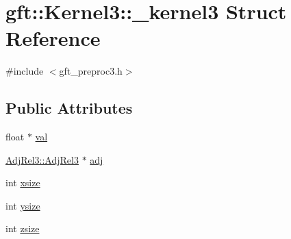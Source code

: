 \hypertarget{structgft_1_1Kernel3_1_1__kernel3}{\section{gft\-:\-:Kernel3\-:\-:\-\_\-kernel3 Struct Reference}
\label{structgft_1_1Kernel3_1_1__kernel3}
}


{\ttfamily \#include $<$gft\-\_\-preproc3.\-h$>$}

\subsection*{Public Attributes}
\begin{DoxyCompactItemize}
\item 
float $\ast$ \hyperlink{structgft_1_1Kernel3_1_1__kernel3_a2cf5ef95427f4d81f2634a065f69c0af}{val}
\item 
\hyperlink{namespacegft_1_1AdjRel3_a0d54e2f148bf5636f3a3faf70d4eb5ae}{Adj\-Rel3\-::\-Adj\-Rel3} $\ast$ \hyperlink{structgft_1_1Kernel3_1_1__kernel3_aaca1908dcf4adcb6f2c248d950f89821}{adj}
\item 
int \hyperlink{structgft_1_1Kernel3_1_1__kernel3_af168a4a8ef87b8044048f61b7eda1ea6}{xsize}
\item 
int \hyperlink{structgft_1_1Kernel3_1_1__kernel3_a7969c6204643647713a7f57b65a9840d}{ysize}
\item 
int \hyperlink{structgft_1_1Kernel3_1_1__kernel3_a4571d07a33802441efb94822dea3d665}{zsize}
\end{DoxyCompactItemize}


